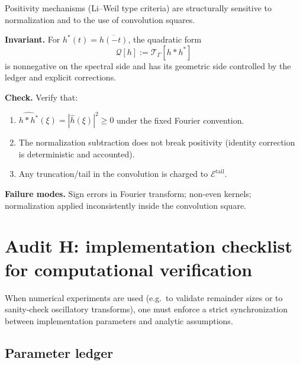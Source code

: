 Positivity mechanisms (Li--Weil type criteria) are structurally sensitive to normalization and to the use of
convolution squares.

\begin{audit}
\label{audit:E.G1}
\textbf{Invariant.} For $h^\ast(t)=\overline{h(-t)}$, the quadratic form
\[
\mathcal{Q}[h]:=\mathcal{T}_\Gamma[h*h^\ast]
\]
is nonnegative on the spectral side and has its geometric side controlled by the ledger and explicit corrections.

\textbf{Check.} Verify that:
\begin{enumerate}
\item $\widehat{h*h^\ast}(\xi)=|\widehat{h}(\xi)|^2\ge 0$ under the fixed Fourier convention.
\item The normalization subtraction does not break positivity (identity correction is deterministic and accounted).
\item Any truncation/tail in the convolution is charged to $\mathcal{E}^{\mathrm{tail}}$.
\end{enumerate}

\textbf{Failure modes.} Sign errors in Fourier transform; non-even kernels; normalization applied inconsistently inside
the convolution square.
\end{audit}

\section{Audit H: implementation checklist for computational verification}
\label{sec:E.implementation}

When numerical experiments are used (e.g.\ to validate remainder sizes or to sanity-check oscillatory transforms),
one must enforce a strict synchronization between implementation parameters and analytic assumptions.

\subsection{Parameter ledger}
\label{subsec:E.param-ledger}


